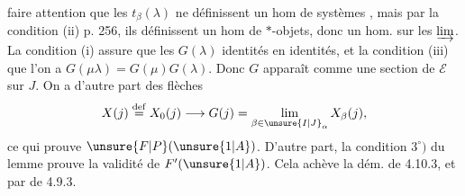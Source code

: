 faire attention que les $t_\beta(\lambda)$ ne définissent  un hom de systèmes , mais par la condition (ii) p. 256, ils définissent un hom de $\ast$-objets, donc un hom. sur les $\varinjlim$.
La condition (i) assure que les $G(\lambda)$  identités en identités, et la condition (iii) que l'on a $G(\mu\lambda)=G(\mu)G(\lambda)$. Donc $G$ apparaît comme une section de $\mathcal E$ sur $J$. On a d'autre part  des flèches
\[
 X(j)\overset{\mathrm{def}}{=}X_0(j)\longrightarrow
 G(j)=\lim_{\beta\in\unsure{I|J}_\alpha}X_\beta(j),
\]
ce qui prouve $\unsure{F|P}(\unsure{1|A})$. D'autre part, la condition $3^\circ)$ du lemme prouve la validité de $F'(\unsure{1|A})$. Cela achève la dém. de 4.10.3, et par  de  4.9.3.
